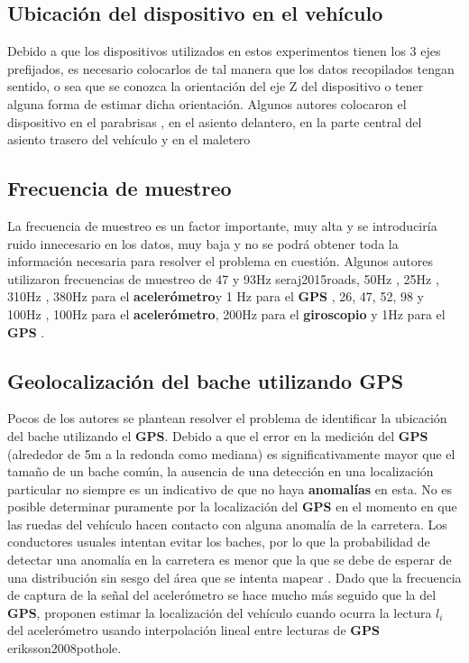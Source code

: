 	\subsection{Ubicación del dispositivo en el vehículo}
		Debido a que los dispositivos utilizados en estos experimentos tienen los 3 ejes prefijados, es necesario colocarlos de tal manera que los
		datos recopilados tengan sentido, o sea que se conozca la orientación del eje Z del dispositivo o tener alguna forma de estimar dicha orientación.
		Algunos autores colocaron el dispositivo en el parabrisas , en el asiento delantero, en la parte
		central del asiento trasero del vehículo y en el maletero 
		
	\subsection{Frecuencia de muestreo}
		La frecuencia de muestreo es un factor importante, muy alta y se introduciría ruido innecesario en los datos, muy baja y no se podrá obtener
		toda la información necesaria para resolver el problema en cuestión. Algunos autores utilizaron frecuencias de muestreo de 47 y 93Hz \brackcite
		{seraj2015roads}, 50Hz , 25Hz , 310Hz , 380Hz para el 
		\textbf{acelerómetro}y 1 Hz para el \textbf{GPS} , 26, 47, 52, 98 y 100Hz , 100Hz para el 
		\textbf{acelerómetro}, 200Hz para el \textbf{giroscopio} y 1Hz para el \textbf{GPS} .

	\subsection{Geolocalización del bache utilizando GPS}
		Pocos de los autores se plantean resolver el problema de identificar la ubicación del bache utilizando el \textbf{GPS}. Debido a que el
		error en la medición del \textbf{GPS} (alrededor de 5m a la redonda como mediana) es significativamente mayor que el tamaño de un bache
		común, la ausencia de una detección en una localización particular no siempre es un indicativo de que no haya \textbf{anomalías} en esta. No es
		posible determinar puramente por la localización del \textbf{GPS} en el momento en que las ruedas del vehículo hacen contacto con alguna
		anomalía de la carretera. Los conductores usuales intentan evitar los baches, por lo que la probabilidad de detectar una anomalía en la
		carretera es menor que la que se debe de esperar de una distribución sin sesgo del área que se intenta mapear .
		Dado que la frecuencia de captura de la señal del acelerómetro se hace mucho más seguido que la del \textbf{GPS}, proponen estimar la localización
		del vehículo cuando ocurra la lectura $l_i$ del acelerómetro usando interpolación lineal entre lecturas de \textbf{GPS} \brackcite
		{eriksson2008pothole}.

